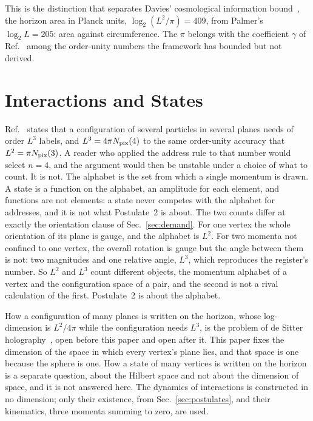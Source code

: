 \documentclass[aps,prd,twocolumn,superscriptaddress,nofootinbib]{revtex4-2}
\begin{document}
This is the distinction that separates Davies' cosmological information bound~\cite{davies2007}, the horizon area in Planck units, $\log_2(L^2/\pi) = 409$, from Palmer's $\log_2 L = 205$: area against circumference. The $\pi$ belongs with the coefficient $\gamma$ of Ref.~\cite{korytko2026} among the order-unity numbers the framework has bounded but not derived.

\section{Interactions and States}
\label{sec:states}

Ref.~\cite{korytko2026c} states that a configuration of several particles in several planes needs of order $L^3$ labels, and $L^3 = 4\pi N_{\rm pix}(4)$ to the same order-unity accuracy that $L^2 = \pi N_{\rm pix}(3)$. A reader who applied the address rule to that number would select $n = 4$, and the argument would then be unstable under a choice of what to count. It is not. The alphabet is the set from which a single momentum is drawn. A state is a function on the alphabet, an amplitude for each element, and functions are not elements: a state never competes with the alphabet for addresses, and it is not what Postulate~2 is about. The two counts differ at exactly the orientation clause of Sec.~\ref{sec:demand}. For one vertex the whole orientation of its plane is gauge, and the alphabet is $L^2$. For two momenta not confined to one vertex, the overall rotation is gauge but the angle between them is not: two magnitudes and one relative angle, $L^3$, which reproduces the register's number. So $L^2$ and $L^3$ count different objects, the momentum alphabet of a vertex and the configuration space of a pair, and the second is not a rival calculation of the first. Postulate~2 is about the alphabet.

How a configuration of many planes is written on the horizon, whose log-dimension is $L^2/4\pi$ while the configuration needs $L^3$, is the problem of de Sitter holography~\cite{bousso1999,banksfischler2001,parikh2003}, open before this paper and open after it. This paper fixes the dimension of the space in which every vertex's plane lies, and that space is one because the sphere is one. How a state of many vertices is written on the horizon is a separate question, about the Hilbert space and not about the dimension of space, and it is not answered here. The dynamics of interactions is constructed in no dimension; only their existence, from Sec.~\ref{sec:postulates}, and their kinematics, three momenta summing to zero, are used.
\end{document}
